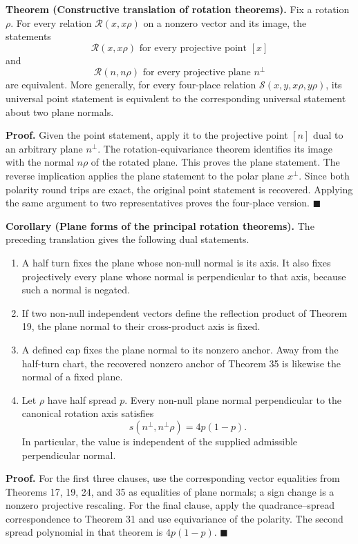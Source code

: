 \documentclass[11pt]{article}
\begin{document}
\medskip
\noindent\textbf{Theorem (Constructive translation of rotation theorems).}
Fix a rotation \(\rho\).  For every relation
\(\mathcal R(x,x\rho)\) on a nonzero vector and its image, the statements
\[
 \mathcal R(x,x\rho)\text{ for every projective point }[x]
\]
and
\[
 \mathcal R(n,n\rho)\text{ for every projective plane }n^\perp
\]
are equivalent.  More generally, for every four-place relation
\(\mathcal S(x,y,x\rho,y\rho)\), its universal point statement is equivalent
to the corresponding universal statement about two plane normals.

\smallskip
\noindent\textbf{Proof.}
Given the point statement, apply it to the projective point \([n]\) dual to
an arbitrary plane \(n^\perp\).  The rotation-equivariance theorem identifies
its image with the normal \(n\rho\) of the rotated plane.  This proves the
plane statement.  The reverse implication applies the plane statement to
the polar plane \(x^\perp\).  Since both polarity round trips are exact, the
original point statement is recovered.  Applying the same argument to two
representatives proves the four-place version. \hfill\(\blacksquare\)

\medskip
\noindent\textbf{Corollary (Plane forms of the principal rotation
theorems).}
The preceding translation gives the following dual statements.
\begin{enumerate}
\item A half turn fixes the plane whose non-null normal is its axis.  It also
fixes projectively every plane whose normal is perpendicular to that axis,
because such a normal is negated.
\item If two non-null independent vectors define the reflection product of
Theorem 19, the plane normal to their cross-product axis is fixed.
\item A defined cap fixes the plane normal to its nonzero anchor.  Away from
the half-turn chart, the recovered nonzero anchor of Theorem 35 is likewise
the normal of a fixed plane.
\item Let \(\rho\) have half spread \(p\).  Every non-null plane normal
perpendicular to the canonical rotation axis satisfies
\[
 s(n^\perp,n^\perp\rho)=4p(1-p).
\]
In particular, the value is independent of the supplied admissible
perpendicular normal.
\end{enumerate}

\smallskip
\noindent\textbf{Proof.}
For the first three clauses, use the corresponding vector equalities from
Theorems 17, 19, 24, and 35 as equalities of plane normals; a sign change is
a nonzero projective rescaling.  For the final clause, apply the
quadrance--spread correspondence to Theorem 31 and use equivariance of the
polarity.  The second spread polynomial in that theorem is
\(4p(1-p)\). \hfill\(\blacksquare\)
\end{document}
